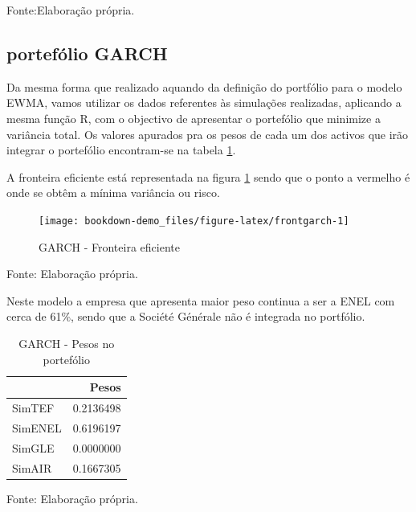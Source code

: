 \documentclass[
  12pt,
  a4paper,
  openany]{book}
\theoremstyle{definition}
\theoremstyle{definition}
\theoremstyle{definition}
\theoremstyle{remark}
\begin{document}
Fonte:Elaboração própria.

\justifying
\bigskip

\hypertarget{portefuxf3lio-garch}{%
\subsection{portefólio GARCH}\label{portefuxf3lio-garch}}

Da mesma forma que realizado aquando da definição do portfólio para o modelo EWMA, vamos utilizar os dados referentes às simulações realizadas, aplicando a mesma função R, com o objectivo de apresentar o portefólio que minimize a variância total. Os valores apurados pra os pesos de cada um dos activos que irão integrar o portefólio encontram-se na tabela \ref{tab:pgarchw}.

A fronteira eficiente está representada na figura \ref{fig:frontgarch} sendo que o ponto a vermelho é onde se obtêm a mínima variância ou risco.

\begin{figure}

{\centering \texttt{[image: bookdown-demo\_files/figure-latex/frontgarch-1]} 

}

\caption{GARCH - Fronteira eficiente}\label{fig:frontgarch}
\end{figure}
\FloatBarrier
\centering

Fonte: Elaboração própria.

\justifying
\bigskip

Neste modelo a empresa que apresenta maior peso continua a ser a ENEL com cerca de 61\%, sendo que a Société Générale não é integrada no portfólio.

\begin{table}[!h]

\caption{\label{tab:pgarchw}GARCH - Pesos no portefólio}
\centering
\begin{tabular}[t]{lr}
\toprule
  & Pesos\\
\midrule
SimTEF & 0.2136498\\
SimENEL & 0.6196197\\
SimGLE & 0.0000000\\
SimAIR & 0.1667305\\
\bottomrule
\end{tabular}
\end{table}
\FloatBarrier
\centering

Fonte: Elaboração própria.

\justifying
\bigskip
\end{document}
